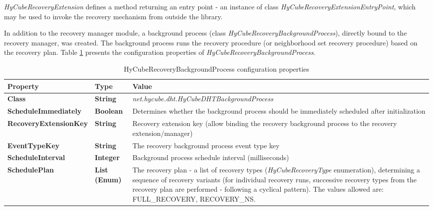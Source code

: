 \emph{HyCubeRecoveryExtension} defines a method returning an entry point - an instance of class \emph{HyCubeRecoveryExtensionEntryPoint}, which may be used to invoke the recovery mechanism from outside the library.

In addition to the recovery manager module, a background process (class \emph{HyCubeRecoveryBackgroundProcess}), directly bound to the recovery manager, was created. The background process runs the recovery procedure (or neighborhood set recovery procedure) based on the recovery plan. Table \ref{tab:libHyCubeRecoveryBackgroundProcess} presents the configuration properties of \emph{HyCubeRecoveryBackgroundProcess}.

\begin{table}
\scriptsize
\begin{center}
\begin{tabular}{p{4cm} p{2.5cm} p{8.0cm}}
	\hline
	\textbf{Property}						& \textbf{Type}					& \textbf{Value}					\\[1mm]
    \hline
	\textbf{Class}							& \textbf{String}				& \textit{net.hycube.dht.HyCubeDHTBackgroundProcess}									\\[1.5mm]	
	\textbf{ScheduleImmediately}			& \textbf{Boolean}				& Determines whether the background process should be immediately scheduled after initialization								\\[1.5mm]	
	\textbf{RecoveryExtensionKey}			& \textbf{String}				& Recovery extension key (allow binding the recovery background process to the recovery extension/manager)						\\[1.5mm]	
	\textbf{EventTypeKey}					& \textbf{String}				& The recovery background process event type key										\\[1.5mm]	
	\textbf{ScheduleInterval}				& \textbf{Integer}				& Background process schedule interval (milliseconds)									\\[1.5mm]	
	\textbf{SchedulePlan}					& \textbf{List (Enum)}			& The recovery plan - a list of recovery types (\emph{HyCubeRecoveryType} enumeration), determining a sequence of recovery variants (for individual recovery runs, successive recovery types from the recovery plan are performed - following a cyclical pattern). The values allowed are: FULL\_RECOVERY, RECOVERY\_NS.			\\[1.5mm]	
    \hline
\end{tabular}
\end{center}
\caption{HyCubeRecoveryBackgroundProcess configuration properties}
\label{tab:libHyCubeRecoveryBackgroundProcess}
\end{table}






